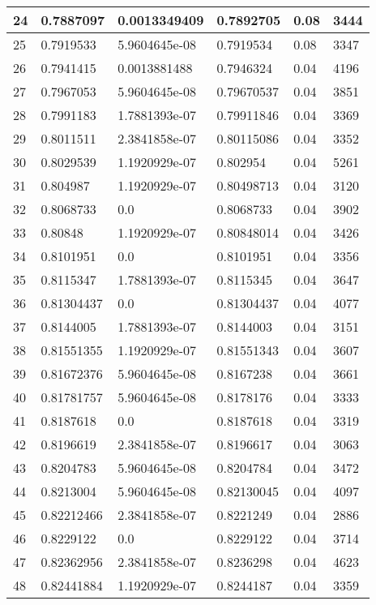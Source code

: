 \begin{longtable}{|l|l|l|l|l|l|}
24 & 0.7887097 & 0.0013349409 & 0.7892705 & 0.08 & 3444 \\ \hline 
25 & 0.7919533 & 5.9604645e-08 & 0.7919534 & 0.08 & 3347 \\ \hline 
26 & 0.7941415 & 0.0013881488 & 0.7946324 & 0.04 & 4196 \\ \hline 
27 & 0.7967053 & 5.9604645e-08 & 0.79670537 & 0.04 & 3851 \\ \hline 
28 & 0.7991183 & 1.7881393e-07 & 0.79911846 & 0.04 & 3369 \\ \hline 
29 & 0.8011511 & 2.3841858e-07 & 0.80115086 & 0.04 & 3352 \\ \hline 
30 & 0.8029539 & 1.1920929e-07 & 0.802954 & 0.04 & 5261 \\ \hline 
31 & 0.804987 & 1.1920929e-07 & 0.80498713 & 0.04 & 3120 \\ \hline 
32 & 0.8068733 & 0.0 & 0.8068733 & 0.04 & 3902 \\ \hline 
33 & 0.80848 & 1.1920929e-07 & 0.80848014 & 0.04 & 3426 \\ \hline 
34 & 0.8101951 & 0.0 & 0.8101951 & 0.04 & 3356 \\ \hline 
35 & 0.8115347 & 1.7881393e-07 & 0.8115345 & 0.04 & 3647 \\ \hline 
36 & 0.81304437 & 0.0 & 0.81304437 & 0.04 & 4077 \\ \hline 
37 & 0.8144005 & 1.7881393e-07 & 0.8144003 & 0.04 & 3151 \\ \hline 
38 & 0.81551355 & 1.1920929e-07 & 0.81551343 & 0.04 & 3607 \\ \hline 
39 & 0.81672376 & 5.9604645e-08 & 0.8167238 & 0.04 & 3661 \\ \hline 
40 & 0.81781757 & 5.9604645e-08 & 0.8178176 & 0.04 & 3333 \\ \hline 
41 & 0.8187618 & 0.0 & 0.8187618 & 0.04 & 3319 \\ \hline 
42 & 0.8196619 & 2.3841858e-07 & 0.8196617 & 0.04 & 3063 \\ \hline 
43 & 0.8204783 & 5.9604645e-08 & 0.8204784 & 0.04 & 3472 \\ \hline 
44 & 0.8213004 & 5.9604645e-08 & 0.82130045 & 0.04 & 4097 \\ \hline 
45 & 0.82212466 & 2.3841858e-07 & 0.8221249 & 0.04 & 2886 \\ \hline 
46 & 0.8229122 & 0.0 & 0.8229122 & 0.04 & 3714 \\ \hline 
47 & 0.82362956 & 2.3841858e-07 & 0.8236298 & 0.04 & 4623 \\ \hline 
48 & 0.82441884 & 1.1920929e-07 & 0.8244187 & 0.04 & 3359 \\ \hline 

\end{longtable}
